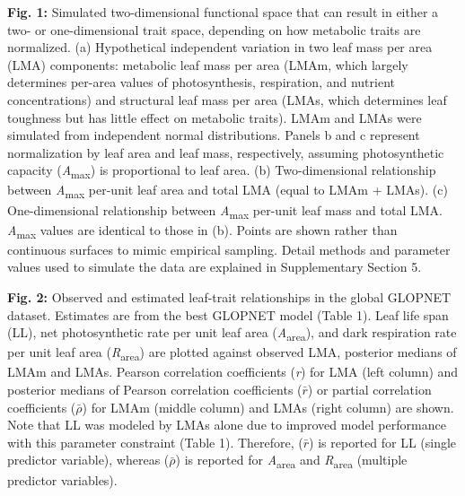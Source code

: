 \documentclass[
  12pt,
  letterpaper,
  DIV=11,
  numbers=noendperiod]{scrartcl}
\begin{document}
\begin{figure}

\centering{

}

\caption{\label{fig-hypo}}

\end{figure}%

\textbf{Fig. 1:} Simulated two-dimensional functional space that can
result in either a two- or one-dimensional trait space, depending on how
metabolic traits are normalized. (a) Hypothetical independent variation
in two leaf mass per area (LMA) components: metabolic leaf mass per area
(LMAm, which largely determines per-area values of photosynthesis,
respiration, and nutrient concentrations) and structural leaf mass per
area (LMAs, which determines leaf toughness but has little effect on
metabolic traits). LMAm and LMAs were simulated from independent normal
distributions. Panels b and c represent normalization by leaf area and
leaf mass, respectively, assuming photosynthetic capacity
(\emph{A}\textsubscript{max}) is proportional to leaf area. (b)
Two-dimensional relationship between \emph{A}\textsubscript{max}
per-unit leaf area and total LMA (equal to LMAm + LMAs). (c)
One-dimensional relationship between \emph{A}\textsubscript{max}
per-unit leaf mass and total LMA. \emph{A}\textsubscript{max} values are
identical to those in (b). Points are shown rather than continuous
surfaces to mimic empirical sampling. Detail methods and parameter
values used to simulate the data are explained in Supplementary Section
5.

\begin{figure}

\centering{

}

\caption{\label{fig-gl_point}}

\end{figure}%

\textbf{Fig. 2:} Observed and estimated leaf-trait relationships in the
global GLOPNET dataset. Estimates are from the best GLOPNET model (Table
1). Leaf life span (LL), net photosynthetic rate per unit leaf area
(\emph{A}\textsubscript{area}), and dark respiration rate per unit leaf
area (\emph{R}\textsubscript{area}) are plotted against observed LMA,
posterior medians of LMAm and LMAs. Pearson correlation coefficients
(\emph{r}) for LMA (left column) and posterior medians of Pearson
correlation coefficients (\(\bar{r}\)) or partial correlation
coefficients (\(\bar{\rho}\)) for LMAm (middle column) and LMAs (right
column) are shown. Note that LL was modeled by LMAs alone due to
improved model performance with this parameter constraint (Table 1).
Therefore, (\(\bar{r}\)) is reported for LL (single predictor variable),
whereas (\(\bar{\rho}\)) is reported for \emph{A}\textsubscript{area}
and \emph{R}\textsubscript{area} (multiple predictor variables).
\end{document}
